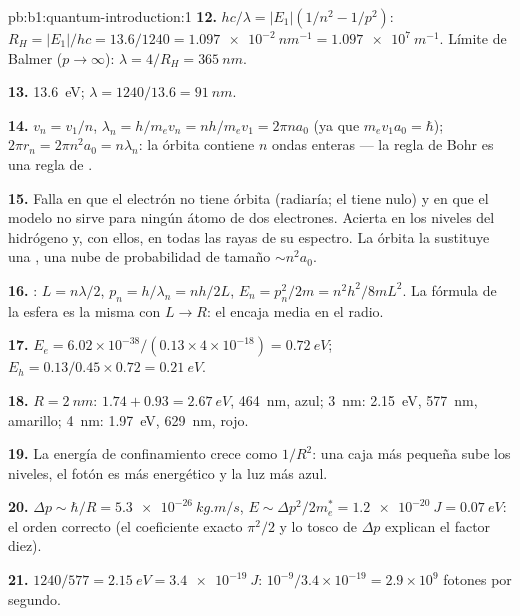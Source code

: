 \begin{solution}{pb:b1:quantum-introduction:1}
\textbf{12.} $hc/\lambda = |E_1|(1/n^2 - 1/p^2)$: $R_H = |E_1|/hc = 13.6/1240 =
\qty{1.097e-2}{nm^{-1}} = \qty{1.097e7}{m^{-1}}$. Límite de Balmer ($p \to \infty$):
$\lambda = 4/R_H = \qty{365}{nm}$.

\textbf{13.} \qty{13.6}{eV}; $\lambda = 1240/13.6 = \qty{91}{nm}$.

\textbf{14.} $v_n = v_1/n$, $\lambda_n = h/m_ev_n = nh/m_ev_1 = 2\pi na_0$ (ya que $m_ev_1a_0
= \hbar$); $2\pi r_n = 2\pi n^2a_0 = n\lambda_n$: la órbita contiene $n$ ondas
enteras --- la regla de Bohr es una regla de .

\textbf{15.} Falla en que el electrón no tiene órbita (radiaría; el
 tiene  nulo) y en que el modelo no
sirve para ningún átomo de dos electrones. Acierta en los niveles del
hidrógeno y, con ellos, en todas las rayas de su espectro. La órbita la
sustituye una , una nube de probabilidad de tamaño $\sim n^2a_0$.

\textbf{16.} : $L = n\lambda/2$, $p_n = h/\lambda_n = nh/2L$, $E_n =
p_n^2/2m = n^2h^2/8mL^2$. La fórmula de la esfera es la misma con $L \to R$:
el  encaja media  en el radio.

\textbf{17.} $E_e = 6.02 \times 10^{-38}/(0.13 \times 4 \times 10^{-18}) = \qty{0.72}{eV}$;
$E_h = 0.13/0.45 \times 0.72 = \qty{0.21}{eV}$.

\textbf{18.} $R = \qty{2}{nm}$: $1.74 + 0.93 = \qty{2.67}{eV}$, \qty{464}{nm}, azul;
\qty{3}{nm}: \qty{2.15}{eV}, \qty{577}{nm}, amarillo; \qty{4}{nm}: \qty{1.97}{eV},
\qty{629}{nm}, rojo.

\textbf{19.} La energía de confinamiento crece como $1/R^2$: una caja más
pequeña sube los niveles, el fotón es más energético y la luz más azul.

\textbf{20.} $\Delta p \sim \hbar/R = \qty{5.3e-26}{kg.m/s}$, $E \sim \Delta p^2/2m_e^\ast =
\qty{1.2e-20}{J} = \qty{0.07}{eV}$: el orden correcto (el coeficiente exacto
$\pi^2/2$ y lo tosco de $\Delta p$ explican el factor diez).

\textbf{21.} $1240/577 = \qty{2.15}{eV} = \qty{3.4e-19}{J}$: $10^{-9}/3.4 \times 10^{-19}
= 2.9 \times 10^9$ fotones por segundo.


\end{solution}
